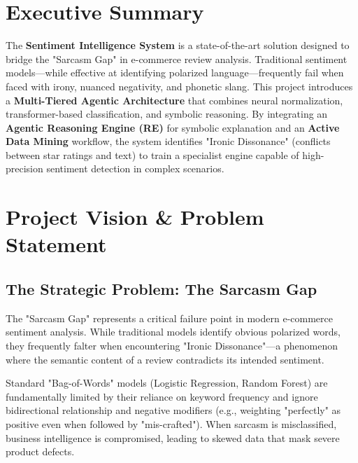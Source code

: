 \documentclass[11pt,oneside]{scrbook}
\begin{document}
\chapter*{Executive Summary}
The \textbf{Sentiment Intelligence System} is a state-of-the-art solution designed to bridge the "Sarcasm Gap" in e-commerce review analysis. Traditional sentiment models---while effective at identifying polarized language---frequently fail when faced with irony, nuanced negativity, and phonetic slang. This project introduces a \textbf{Multi-Tiered Agentic Architecture} that combines neural normalization, transformer-based classification, and symbolic reasoning. By integrating an \textbf{Agentic Reasoning Engine (RE)} for symbolic explanation and an \textbf{Active Data Mining} workflow, the system identifies "Ironic Dissonance" (conflicts between star ratings and text) to train a specialist engine capable of high-precision sentiment detection in complex scenarios.

\tableofcontents
\listoftables
\listoffigures

\mainmatter
\markboth{}{}
\pagestyle{scrheadings}
\renewcommand{\chapterpagestyle}{scrheadings}

\chapter{Project Vision \& Problem Statement}

\section{The Strategic Problem: The Sarcasm Gap}
The "Sarcasm Gap" represents a critical failure point in modern e-commerce sentiment analysis. While traditional models identify obvious polarized words, they frequently falter when encountering "Ironic Dissonance"---a phenomenon where the semantic content of a review contradicts its intended sentiment. 

Standard "Bag-of-Words" models (Logistic Regression, Random Forest) are fundamentally limited by their reliance on keyword frequency and ignore bidirectional relationship and negative modifiers (e.g., weighting "perfectly" as positive even when followed by "mis-crafted"). When sarcasm is misclassified, business intelligence is compromised, leading to skewed data that mask severe product defects.
\end{document}
